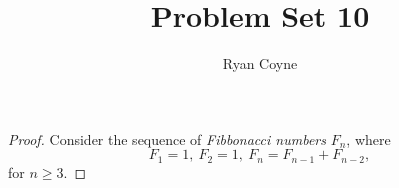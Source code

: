 \documentclass[12pt]{article}
\begin{document}
    \title{Problem Set 10}
    \author{Ryan Coyne}
    \maketitle
    
    \begin{proof}{Consider the sequence of \textit{Fibbonacci numbers} {\(F_n\)}, where \begin{equation*}
        F_1 = 1,\ F_2 = 1,\ F_n = F_{n-1} + F_{n-2},
    \end{equation*}
    for \(n\geq3\).}
    
    \end{proof}
\end{document}
